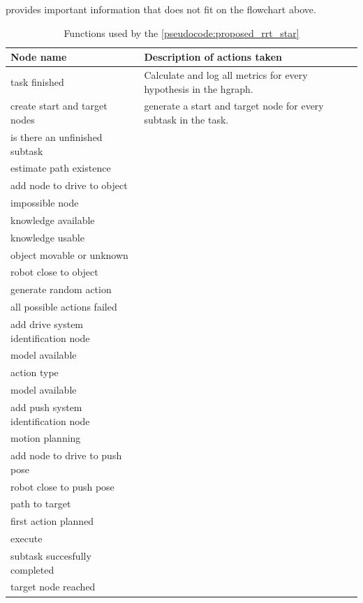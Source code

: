 

 provides important information that does not fit on the flowchart above.

\begin{table}[H]
\centering
\begin{tabular}[t]{l p{10cm}}
  \textbf{Node name} & \textbf{Description of actions taken}\\\hline
  task finished & Calculate and log all metrics for every hypothesis in the \ac{hgraph}.\\
  create start and target nodes & generate a start and target node for every subtask in the task.\\
  is there an unfinished subtask & \\
estimate path existence & \\
add node to drive to object& \\
impossible node & \\
knowledge available& \\
knowledge usable& \\
object movable or unknown& \\
robot close to object& \\
generate random action& \\
all possible actions failed& \\
\shortstack[l]{add drive system\\identification node}& \\
model available& \\
action type& \\
model available& \\
add push system identification node& \\
motion planning& \\
add node to drive to push pose& \\
robot close to push pose& \\
path to target& \\
first action planned& \\
execute& \\
subtask succesfully completed& \\
target node reached& \\
\end{tabular}
\caption{Functions used by the \cref{pseudocode:proposed_rrt_star}}%
\label{table:explainer_hgraph_figures_nodes}
\end{table}

